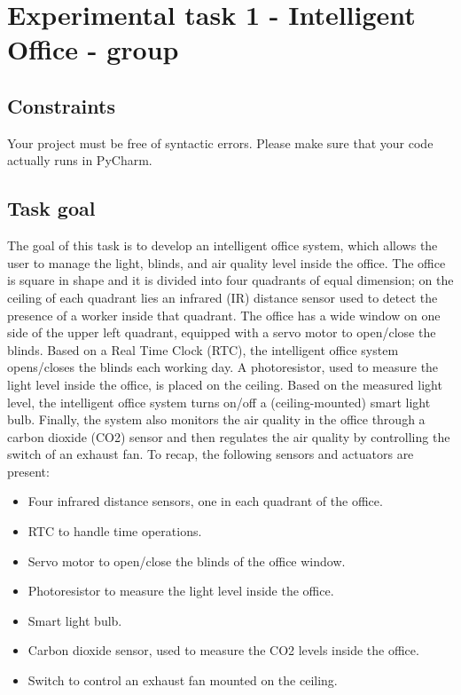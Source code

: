 \chapter{Experimental task 1 - Intelligent Office - \tdd group}
\section{Constraints}
Your project must be free of syntactic errors. Please make sure that your code actually runs in PyCharm.

\section{Task goal}
The goal of this task is to develop an intelligent office system, which allows the user to manage the light, blinds, and air quality level inside the office.
The office is square in shape and it is divided into four quadrants of equal dimension; on the ceiling of each quadrant lies an infrared (IR) distance sensor used to detect the presence of a worker inside that quadrant. 
The office has a wide window on one side of the upper left quadrant, equipped with a servo motor to open/close the blinds. 
Based on a Real Time Clock (RTC), the intelligent office system opens/closes the blinds each working day. 
A photoresistor, used to measure the light level inside the office, is placed on the ceiling. Based on the measured light level, the intelligent office system turns on/off a (ceiling-mounted) smart light bulb. 
Finally, the system also monitors the air quality in the office through a carbon dioxide (CO2) sensor and then regulates the air quality by controlling the switch of an exhaust fan.
To recap, the following sensors and actuators are present:

\begin{itemize}
    \item Four infrared distance sensors, one in each quadrant of the office.
    \item RTC to handle time operations.
    \item Servo motor to open/close the blinds of the office window.
    \item Photoresistor to measure the light level inside the office.
    \item Smart light bulb.
    \item Carbon dioxide sensor, used to measure the CO2 levels inside the office.
    \item Switch to control an exhaust fan mounted on the ceiling.
\end{itemize}

